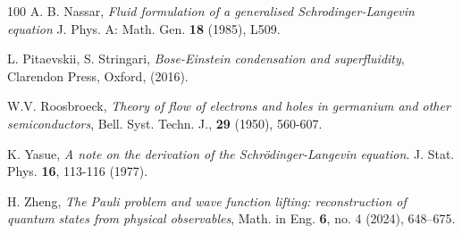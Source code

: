 \documentclass[leqno]{amsart}
\theoremstyle{plain}
\theoremstyle{definition}
\theoremstyle{remark}
\theoremstyle{plain}
\theoremstyle{plain}
\numberwithin{equation}{section}
\begin{document}
\begin{thebibliography}{100}
 A. B. Nassar, \emph{Fluid formulation of a generalised Schrodinger-Langevin equation} J. Phys. A: Math. Gen. {\bf 18} (1985), L509.

 L. Pitaevskii, S. Stringari, \emph{Bose-Einstein condensation and superfluidity}, Clarendon Press, Oxford, (2016).

 W.V. Roosbroeck, \emph{Theory of flow of electrons and holes in germanium and other semiconductors}, Bell. Syst. Techn. J., {\bf 29} (1950), 560-607.

 K. Yasue, \emph{A note on the derivation of the Schr\"odinger-Langevin equation}. J. Stat. Phys. {\bf 16}, 113-116 (1977).

 H. Zheng, \emph{The Pauli problem and wave function lifting: reconstruction of quantum states from physical observables}, Math. in Eng. {\bf 6}, no. 4 (2024), 648--675.

\end{thebibliography}
\end{document}

